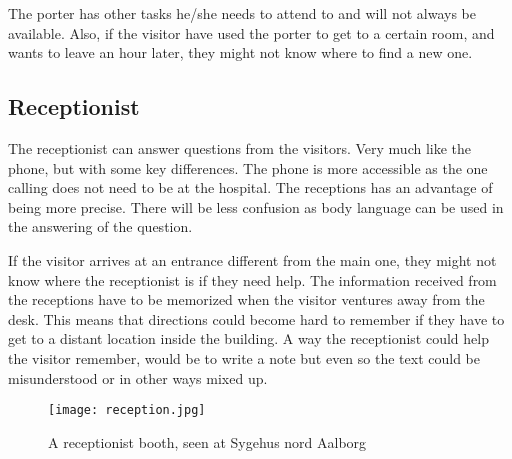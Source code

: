 The porter has other tasks he/she needs to attend to and will not always be available. Also, if the visitor have used the porter to get to a certain room, and wants to leave an hour later, they might not know where to find a new one. 

\subsection{Receptionist}
The receptionist can answer questions from the visitors\cite{job}. Very much like the phone, but with some key differences. The phone is more accessible as the one calling does not need to be at the hospital. The receptions has an advantage of being more precise. There will be less confusion as body language can be used in the answering of the question\cite{body_vs_phone}.

If the visitor arrives at an entrance different from the main one, they might not know where the receptionist is if they need help. The information received from the receptions have to be memorized when the visitor ventures away from the desk. This means that directions could become hard to remember if they have to get to a distant location inside the building. A way the receptionist could help the visitor remember, would be to write a note but even so the text could be misunderstood or in other ways mixed up.

  \begin{figure}[ht!]
    \centering
    \texttt{[image: reception.jpg]}
    \caption{A receptionist booth, seen at Sygehus nord Aalborg}
    \label{overflow}
  \end{figure}
